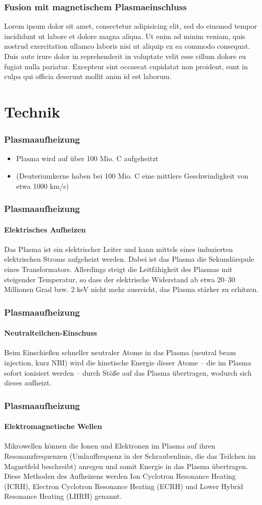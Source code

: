 \documentclass[aspectratio=169]{beamer}
\begin{document}
    \begin{frame}
      \frametitle{Fusion mit magnetischem Plasmaeinschluss}
      Lorem ipsum dolor sit amet, consectetur adipisicing elit, sed do eiusmod tempor incididunt ut labore et dolore magna aliqua. Ut enim ad minim veniam, quis nostrud exercitation ullamco laboris nisi ut aliquip ex ea commodo consequat. Duis aute irure dolor in reprehenderit in voluptate velit esse cillum dolore eu fugiat nulla pariatur. Excepteur sint occaecat cupidatat non proident, sunt in culpa qui officia deserunt mollit anim id est laborum.
    \end{frame}

  \section{Technik}

    \begin{frame}
      \frametitle{Plasmaaufheizung}
      \begin{itemize}
        \item Plasma wird auf über 100 Mio. C aufgeheitzt
        \pause
        \item (Deuteriumkerne haben bei 100 Mio. C eine mittlere Geschwindigkeit von etwa 1000 km/s)
      \end{itemize}
    \end{frame}

    \begin{frame}
      \frametitle{Plasmaaufheizung}
      \framesubtitle{Elektrisches Aufheizen}
      Das Plasma ist ein elektrischer Leiter und kann mittels eines induzierten elektrischen Stroms aufgeheizt werden. Dabei ist das Plasma die Sekundärspule eines Transformators. Allerdings steigt die Leitfähigkeit des Plasmas mit steigender Temperatur, so dass der elektrische Widerstand ab etwa 20–30 Millionen Grad bzw. 2 keV nicht mehr ausreicht, das Plasma stärker zu erhitzen.
    \end{frame}

    \begin{frame}
      \frametitle{Plasmaaufheizung}
      \framesubtitle{Neutralteilchen-Einschuss}
      Beim Einschießen schneller neutraler Atome in das Plasma (neutral beam injection, kurz NBI) wird die kinetische Energie dieser Atome – die im Plasma sofort ionisiert werden – durch Stöße auf das Plasma übertragen, wodurch sich dieses aufheizt.
    \end{frame}

    \begin{frame}
      \frametitle{Plasmaaufheizung}
      \framesubtitle{Elektromagnetische Wellen}
      Mikrowellen können die Ionen und Elektronen im Plasma auf ihren Resonanzfrequenzen (Umlauffrequenz in der Schraubenlinie, die das Teilchen im Magnetfeld beschreibt) anregen und somit Energie in das Plasma übertragen. Diese Methoden des Aufheizens werden Ion Cyclotron Resonance Heating (ICRH), Electron Cyclotron Resonance Heating (ECRH) und Lower Hybrid Resonance Heating (LHRH) genannt.
    \end{frame}
\end{document}
